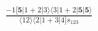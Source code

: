 \documentclass[varwidth, border=5pt]{standalone}
\begin{document}
\begin{my}
$\begin{gathered}
\scriptscriptstyle\frac{-1[𝟓|1+2|3⟩⟨3|1+2|𝟓|𝟓⟩}{⟨12⟩⟨2|1+3|4]s_{123}}
\end{gathered}$
\end{my}
\end{document}
